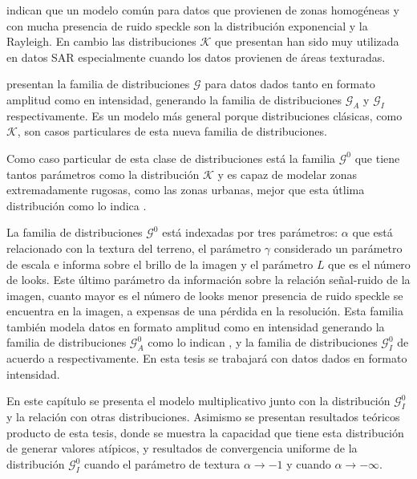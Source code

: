 \citet{Frery97} indican que un modelo común para datos que provienen de zonas homogéneas y con mucha presencia de ruido speckle son la distribución exponencial y la Rayleigh. En cambio las distribuciones $\mathcal{K}$ que presentan \citet{Jakeman87} han sido muy utilizada en datos SAR especialmente cuando los datos provienen de áreas texturadas. 

 \citet{Frery97,Frery99} presentan la familia de distribuciones $\mathcal{G}$ para datos dados tanto en formato amplitud como en intensidad, generando la familia de distribuciones $\mathcal{G}_A$ y $\mathcal{G}_I$ respectivamente. Es un modelo más general porque distribuciones clásicas, como $\mathcal{K}$, son casos particulares de esta nueva familia de distribuciones.

Como caso particular de esta clase de distribuciones está la familia $\mathcal{G}^0$ que tiene tantos parámetros como la distribución $\mathcal{K}$ y es capaz de modelar zonas extremadamente rugosas, como las zonas urbanas, mejor que esta útlima distribución como lo indica \citet{Mejail99}. 

La familia de distribuciones $\mathcal{G}^0$ está indexadas por tres parámetros: $\alpha$ que está relacionado con la textura del terreno, el parámetro $\gamma$ considerado un parámetro de escala e informa sobre el brillo de la imagen y el parámetro $L$ que es el número de looks. Este último parámetro da información sobre la relación señal-ruido de la imagen, cuanto mayor es el número de looks menor presencia de ruido speckle se encuentra en la imagen, a expensas de una pérdida en la resolución. Esta familia también modela datos en formato amplitud como en intensidad generando la familia de distribuciones $\mathcal{G}_A^0$ como lo indican \citet{Frery97}, y la familia de distribuciones $\mathcal{G}_I^0$ de acuerdo a \citet{Frery97,Frery99} respectivamente. En esta tesis se trabajará con datos dados en formato intensidad.

En este capítulo se presenta el modelo multiplicativo junto con la distribución $\mathcal{G}_I^0$ y la relación con otras distribuciones. Asimismo se presentan resultados teóricos producto de esta tesis, donde se muestra la capacidad que tiene esta distribución de generar valores atípicos, y resultados de convergencia uniforme de la distribución $\mathcal{G}_I^0$ cuando el parámetro de textura $\alpha \rightarrow -1$ y cuando $\alpha \rightarrow -\infty$.


